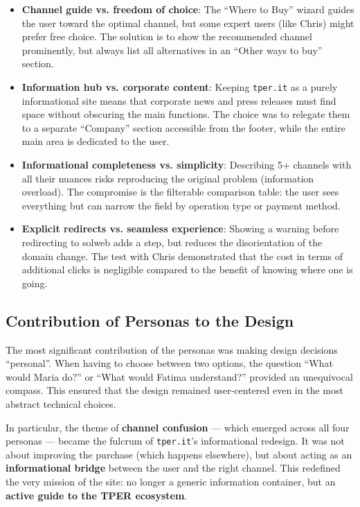 \begin{itemize}
    \item \textbf{Channel guide vs. freedom of choice}: The ``Where to Buy'' wizard guides the user toward the optimal channel, but some expert users (like Chris) might prefer free choice. The solution is to show the recommended channel prominently, but always list all alternatives in an ``Other ways to buy'' section.
    \item \textbf{Information hub vs. corporate content}: Keeping \texttt{tper.it} as a purely informational site means that corporate news and press releases must find space without obscuring the main functions. The choice was to relegate them to a separate ``Company'' section accessible from the footer, while the entire main area is dedicated to the user.
    \item \textbf{Informational completeness vs. simplicity}: Describing 5+ channels with all their nuances risks reproducing the original problem (information overload). The compromise is the filterable comparison table: the user sees everything but can narrow the field by operation type or payment method.
    \item \textbf{Explicit redirects vs. seamless experience}: Showing a warning before redirecting to solweb adds a step, but reduces the disorientation of the domain change. The test with Chris demonstrated that the cost in terms of additional clicks is negligible compared to the benefit of knowing where one is going.
\end{itemize}

\subsection{Contribution of Personas to the Design}

The most significant contribution of the personas was making design decisions ``personal''. When having to choose between two options, the question ``What would Maria do?'' or ``What would Fatima understand?'' provided an unequivocal compass. This ensured that the design remained user-centered even in the most abstract technical choices.

In particular, the theme of \textbf{channel confusion} --- which emerged across all four personas --- became the fulcrum of \texttt{tper.it}'s informational redesign. It was not about improving the purchase (which happens elsewhere), but about acting as an \textbf{informational bridge} between the user and the right channel. This redefined the very mission of the site: no longer a generic information container, but an \textbf{active guide to the TPER ecosystem}.

